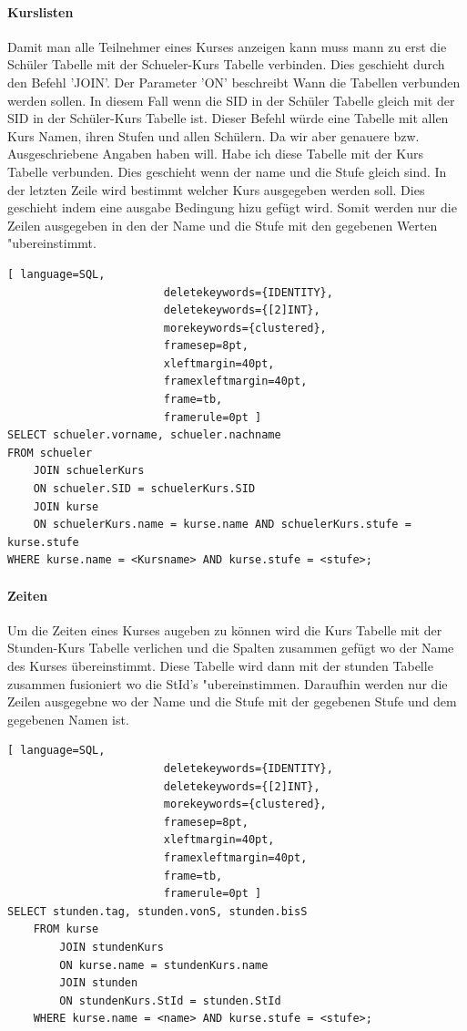\documentclass[a4paper, 12pt]{article}
\theoremstyle{plain}
\theoremstyle{definition}
\begin{document}
	\paragraph{Kurslisten} \label{sec:selKursLi} Damit man alle Teilnehmer eines Kurses anzeigen kann muss mann zu erst die Schüler Tabelle mit der Schueler-Kurs Tabelle verbinden. Dies geschieht durch den Befehl 'JOIN'. Der Parameter 'ON' beschreibt Wann die Tabellen verbunden werden sollen. In diesem Fall wenn die SID in der Schüler Tabelle gleich mit der SID in der Schüler-Kurs Tabelle ist. Dieser Befehl würde eine Tabelle mit allen Kurs Namen, ihren Stufen und allen Schülern. Da wir aber genauere bzw. Ausgeschriebene Angaben haben will. Habe ich diese Tabelle mit der Kurs Tabelle verbunden. Dies geschieht wenn der name  und die Stufe gleich sind. In der letzten Zeile wird bestimmt welcher Kurs ausgegeben werden soll. Dies geschieht indem eine ausgabe Bedingung hizu gefügt wird. Somit werden nur die Zeilen ausgegeben in den der Name und die Stufe mit den gegebenen Werten "ubereinstimmt. 
	\begin{lstlisting}[ language=SQL,
	                    deletekeywords={IDENTITY},
	                    deletekeywords={[2]INT},
	                    morekeywords={clustered},
	                    framesep=8pt,
	                    xleftmargin=40pt,
	                    framexleftmargin=40pt,
	                    frame=tb,
	                    framerule=0pt ]	
SELECT schueler.vorname, schueler.nachname
FROM schueler
	JOIN schuelerKurs
	ON schueler.SID = schuelerKurs.SID
	JOIN kurse
	ON schuelerKurs.name = kurse.name AND schuelerKurs.stufe = kurse.stufe
WHERE kurse.name = <Kursname> AND kurse.stufe = <stufe>;
	\end{lstlisting}	
	\paragraph{Zeiten} \label{sec:selZeit}
	Um die Zeiten eines Kurses augeben zu können wird die Kurs Tabelle mit der Stunden-Kurs Tabelle verlichen und die Spalten zusammen gefügt wo der Name des Kurses übereinstimmt. Diese Tabelle wird dann mit der stunden Tabelle zusammen fusioniert wo die StId's "ubereinstimmen. Daraufhin werden nur die Zeilen ausgegebne wo der Name und die Stufe mit der gegebenen Stufe und dem gegebenen Namen ist.
	\begin{lstlisting}[ language=SQL,
	                    deletekeywords={IDENTITY},
	                    deletekeywords={[2]INT},
	                    morekeywords={clustered},
	                    framesep=8pt,
	                    xleftmargin=40pt,
	                    framexleftmargin=40pt,
	                    frame=tb,
	                    framerule=0pt ]	
SELECT stunden.tag, stunden.vonS, stunden.bisS
    FROM kurse
        JOIN stundenKurs
        ON kurse.name = stundenKurs.name
        JOIN stunden
        ON stundenKurs.StId = stunden.StId
    WHERE kurse.name = <name> AND kurse.stufe = <stufe>;
	\end{lstlisting}	
	
\end{document}
